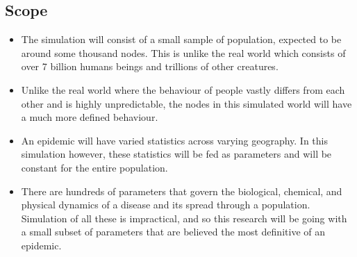 \documentclass[conference]{IEEEtran}
\begin{document}
        \subsection{Scope}
            \begin{itemize}
                \item The simulation will consist of a small sample of population, expected to be around some thousand nodes. This is unlike the real world which consists of over 7 billion humans beings and trillions of other creatures.
                \item Unlike the real world where the behaviour of people vastly differs from each other and is highly unpredictable, the nodes in this simulated world will have a much more defined behaviour.
                \item An epidemic will have varied statistics across varying geography. In this simulation however, these statistics will be fed as parameters and will be constant for the entire population.
                \item There are hundreds of parameters that govern the biological, chemical, and physical dynamics of a disease and its spread through a population. Simulation of all these is impractical, and so this research will be going with a small subset of parameters that are believed the most definitive of an epidemic.
            \end{itemize}
    
    \vspace{0.1in}
\end{document}
